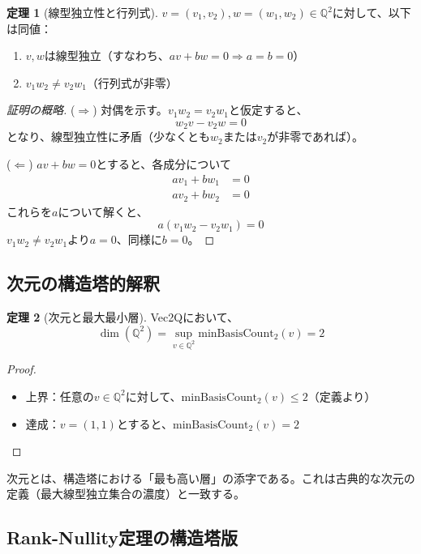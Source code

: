 \documentclass[11pt,a4paper]{ltjsarticle}
\theoremstyle{definition}
\newtheorem{theorem}{定理}[section]
\newcommand{\Q}{\mathbb{Q}}
\newcommand{\minBasis}{\mathrm{minBasisCount}}
\begin{document}
\begin{theorem}[線型独立性と行列式]
$v = (v_1, v_2), w = (w_1, w_2) \in \Q^2$に対して、以下は同値：
\begin{enumerate}
\item $v, w$は線型独立（すなわち、$av + bw = 0 \Rightarrow a = b = 0$）
\item $v_1 w_2 \neq v_2 w_1$（行列式が非零）
\end{enumerate}
\end{theorem}

\begin{proof}[証明の概略]
($\Rightarrow$) 対偶を示す。$v_1 w_2 = v_2 w_1$と仮定すると、
\[
w_2 v - v_2 w = 0
\]
となり、線型独立性に矛盾（少なくとも$w_2$または$v_2$が非零であれば）。

($\Leftarrow$) $av + bw = 0$とすると、各成分について
\begin{align*}
a v_1 + b w_1 &= 0 \\
a v_2 + b w_2 &= 0
\end{align*}
これらを$a$について解くと、
\[
a(v_1 w_2 - v_2 w_1) = 0
\]
$v_1 w_2 \neq v_2 w_1$より$a = 0$、同様に$b = 0$。
\end{proof}

\subsection{次元の構造塔的解釈}

\begin{theorem}[次元と最大最小層]
Vec2Qにおいて、
\[
\dim(\Q^2) = \sup_{v \in \Q^2} \minBasis_2(v) = 2
\]
\end{theorem}

\begin{proof}
\begin{itemize}
\item 上界：任意の$v \in \Q^2$に対して、$\minBasis_2(v) \leq 2$（定義より）
\item 達成：$v = (1, 1)$とすると、$\minBasis_2(v) = 2$
\end{itemize}
\end{proof}

\begin{tcolorbox}[colback=green!5!white,colframe=green!75!black,title=構造塔の視点]
次元とは、構造塔における「最も高い層」の添字である。これは古典的な次元の定義（最大線型独立集合の濃度）と一致する。
\end{tcolorbox}

\subsection{Rank-Nullity定理の構造塔版}
\end{document}
